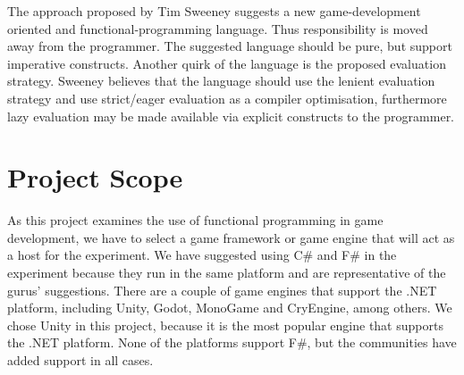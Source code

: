 
The approach proposed by Tim Sweeney suggests a new game-development oriented and functional-programming language\cite{theNextMainstreanProgrammingLanguage}. Thus responsibility is moved away from the programmer. The suggested language should be pure, but support imperative constructs. Another quirk of the language is the proposed evaluation strategy. Sweeney believes that the language should use the lenient evaluation strategy and use strict/eager evaluation as a compiler optimisation, furthermore lazy evaluation may be made available via explicit constructs to the programmer.



\section{Project Scope}
As this project examines the use of functional programming in game development, we have to select a game framework or game engine that will act as a host for the experiment. We have suggested using C\# and F\# in the experiment because they run in the same platform and are representative of the gurus' suggestions. There are a couple of game engines that support the .NET platform, including Unity, Godot, MonoGame and CryEngine, among others\cite{p92018gameplay}. We chose Unity in this project, because it is the most popular engine that supports the .NET platform\cite{game:engine:popularity}. None of the platforms support F\#, but the communities have added support in all cases\cite{fsharp2019plugin,godot:fsharp,monogame:fsharp,cryengine:fsharp}.
